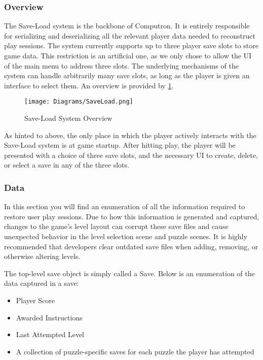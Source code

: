 \subsubsection{Overview}
The Save-Load system is the backbone of Computron. It is entirely responsible for serializing and deserializing all the relevant player data needed to reconstruct play sessions. The system currently supports up to three player save slots to store game data. This restriction is an artificial one, as we only chose to allow the UI of the main menu to address three slots. The underlying mechanisms of the system can handle arbitrarily many save slots, as long as the player is given an interface to select them. An overview is provided by \ref{fig:saveload_system_diagram}.

\begin{figure}[!hb]
    \caption{Save-Load System Overview}
    \label{fig:saveload_system_diagram}
    \centering
    \texttt{[image: Diagrams/SaveLoad.png]}
\end{figure}


As hinted to above, the only place in which the player actively interacts with the Save-Load system is at game startup. After hitting play, the player will be presented with a choice of three save slots, and the necessary UI to create, delete, or select a save in any of the three slots. 

\subsubsection{Data}
In this section you will find an enumeration of all the information required to restore user play sessions. Due to how this information is generated and captured, changes to the game's level layout can corrupt these save files and cause unexpected behavior in the level selection scene and puzzle scenes. It is highly recommended that developers clear outdated save files when adding, removing, or otherwise altering levels.

The top-level save object is simply called a Save. Below is an enumeration of the data captured in a save:
\begin{itemize}
    \item Player Score
    \item Awarded Instructions
    \item Last Attempted Level
    \item A collection of puzzle-specific saves for each puzzle the player has attempted
\end{itemize}

